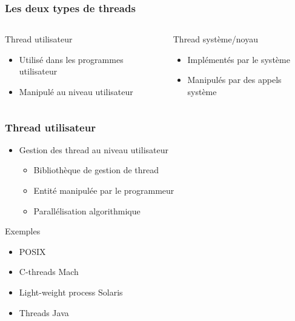 \begin{frame}
 \frametitle{Les deux types de threads}
 \begin{columns}
 \begin{block}{Thread utilisateur}
 \begin{itemize}
 \item Utilisé dans les programmes utilisateur
 \item Manipulé au niveau utilisateur
 \end{itemize}
 \end{block}
 \begin{block}{Thread système/noyau}
 \begin{itemize}
 \item Implémentés par le système
 \item Manipulés par des appels système
 \end{itemize}
 \end{block}
 \end{columns}
\end{frame}


\begin{frame}
 \frametitle{Thread utilisateur}
 \begin{itemize}
 \item Gestion des thread au niveau utilisateur
 \begin{itemize}
 \item Bibliothèque de gestion de thread
 \item Entité manipulée par le programmeur
 \item Parallélisation algorithmique
 \end{itemize}
 \end{itemize}


 \begin{exampleblock}{Exemples}
 \begin{itemize}
 \item POSIX
 \item C-threads Mach
 \item Light-weight process Solaris
 \item Threads Java
 \end{itemize}
 \end{exampleblock}
\end{frame}


